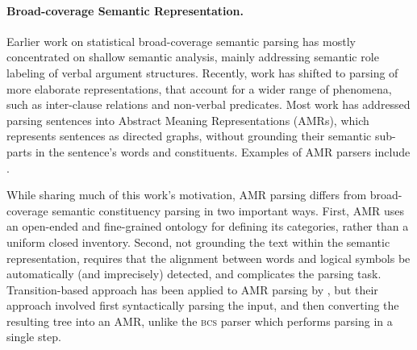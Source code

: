 \documentclass[11pt]{article}
\begin{document}
\paragraph{Broad-coverage Semantic Representation.}
Earlier work on statistical broad-coverage semantic parsing has mostly
concentrated on shallow semantic analysis, mainly addressing semantic
role labeling of verbal argument structures. 
Recently, work has shifted to parsing of more elaborate representations, that account
for a wider range of phenomena, such as inter-clause relations and non-verbal predicates.
Most work has addressed parsing sentences into Abstract Meaning Representations (AMRs),
which represents sentences as directed graphs, without
grounding their semantic sub-parts in the sentence's words and constituents.
Examples of AMR parsers include 
\cite{flanigan2014discriminative,vanderwende2015amr,pust2015parsing,artzi2015broad}. 

While sharing much of this work's motivation, AMR parsing differs from broad-coverage
semantic constituency parsing in two important ways.
First, AMR uses an open-ended and fine-grained ontology for defining its categories,
rather than a uniform closed inventory.
Second, not grounding the text within the semantic representation, 
requires that the alignment between words and logical symbols be automatically
(and imprecisely) detected, and complicates the parsing task.
Transition-based approach has been applied to AMR parsing by ,
but their approach involved first syntactically parsing the input, and then converting
the resulting tree into an AMR, unlike the \textsc{bcs} parser which performs parsing in a single step.
\end{document}
